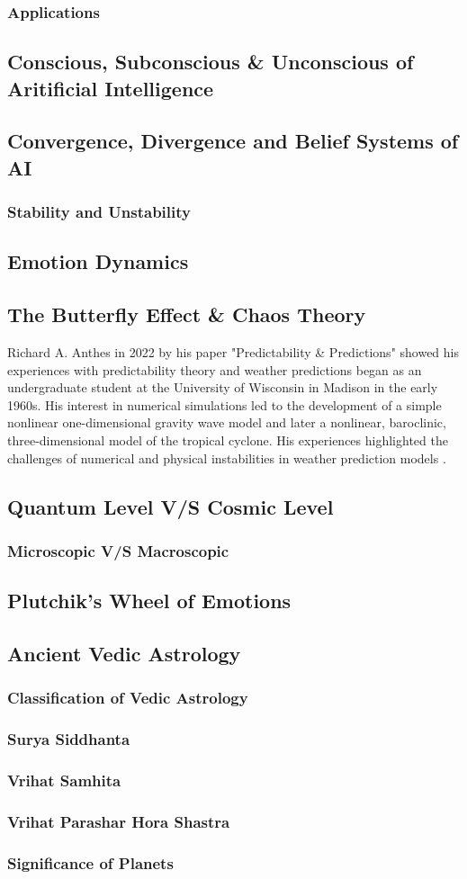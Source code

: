 \subsubsection{Applications}
\cite{ISSN-2456-2165}
\subsection{Conscious, Subconscious \& Unconscious of Aritificial Intelligence}
\subsection{Convergence, Divergence and Belief Systems of AI}
\subsubsection{Stability and Unstability}
\subsection{Emotion Dynamics}
\subsection{The Butterfly Effect \& Chaos Theory}
Richard A. Anthes in 2022 by his paper "Predictability \& Predictions" showed his experiences with predictability theory and weather predictions began as an undergraduate student at the University of Wisconsin in Madison in the early 1960s. His interest in numerical simulations led to the development of a simple nonlinear one-dimensional gravity wave model and later a nonlinear, baroclinic, three-dimensional model of the tropical cyclone. His experiences highlighted the challenges of numerical and physical instabilities in weather prediction models \cite{atmos13081292}. \cite{encyclopedia2030084}
\subsection{Quantum Level V/S Cosmic Level}
\subsubsection{Microscopic V/S Macroscopic}
\subsection{Plutchik's Wheel of Emotions}
\subsection{Ancient Vedic Astrology}
\subsubsection{Classification of Vedic Astrology}
\subsubsection{Surya Siddhanta}
\subsubsection{Vrihat Samhita}
\subsubsection{Vrihat Parashar Hora Shastra}
\subsubsection{Significance of Planets}